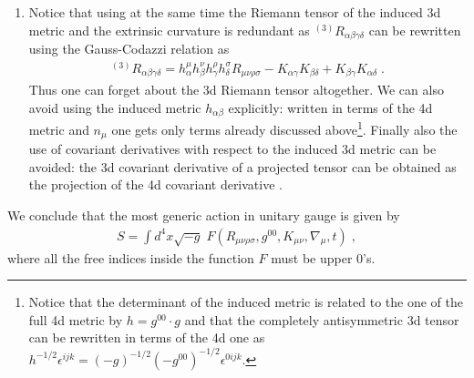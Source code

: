 \documentclass[12pt,letterpaper]{article}
\def\be{\begin{eqnarray}}
\def\ee{\end{eqnarray}}
\begin{document}
{\begin{enumerate}
\be
K_{\mu\nu} \equiv h_\mu^\sigma \nabla_\sigma n_\nu \;.
\ee
The index $\nu$ is already projected on the surface because $n^\nu \nabla_\sigma n_\nu = \frac12 \nabla_\sigma (n^\nu n_\nu) =0$. The covariant derivative of $n_\nu $ perpendicular to the surface can be rewritten as 
\be
n^\sigma \nabla_\sigma n_\nu = - \frac12 (-g^{00})^{-1} h^\mu_\nu \partial_\mu(-g^{00})
\ee
so that it does not give rise to new terms. Therefore all covariant derivatives of $n_\mu$ can be written using the extrinsic curvature $K_{\mu\nu}$ (and its covariant derivatives) and derivatives of $g^{00}$.

\item Notice that using at the same time the Riemann tensor of the induced 3d metric and the extrinsic curvature is redundant as $^{(3)} R_{\alpha\beta\gamma\delta}$ can be rewritten using the Gauss-Codazzi relation
as \cite{Wald:1984rg}
\be
^{(3)} R_{\alpha\beta\gamma\delta}= h^\mu_\alpha h^\nu_\beta h^\rho_\gamma h^\sigma_\delta R_{\mu\nu\rho\sigma} -K_{\alpha\gamma}K_{\beta\delta} +K_{\beta\gamma}K_{\alpha\delta} \;.
\ee
Thus one can forget about the 3d Riemann tensor altogether. We can also avoid using the induced metric $h_{\alpha\beta}$ explicitly: written in terms of the 4d metric and $n_\mu$ one gets only terms already discussed above\footnote{Notice that the determinant of the induced metric is related to the one of the full 4d metric by $h = g^{00} \cdot g$ and that the completely antisymmetric 3d tensor can be rewritten in terms of the 4d one as $h^{-1/2} \epsilon^{ijk} = (-g)^{-1/2} (-g^{00})^{-1/2} \epsilon^{0ijk}$.}. Finally also the use of covariant derivatives with respect to the induced 3d metric can be avoided: the 3d covariant derivative of a projected tensor can be obtained as the projection of the 4d covariant derivative \cite{Wald:1984rg}.

\end{enumerate}

We conclude that the most generic action in unitary gauge is given by 
\be
S = \int d^4 x \sqrt{-g} \; F(R_{\mu\nu\rho\sigma}, g^{00}, K_{\mu\nu},\nabla_\mu,t) \;,
\ee
where all the free indices inside the function $F$ must be upper 0's.




}
\end{document}

